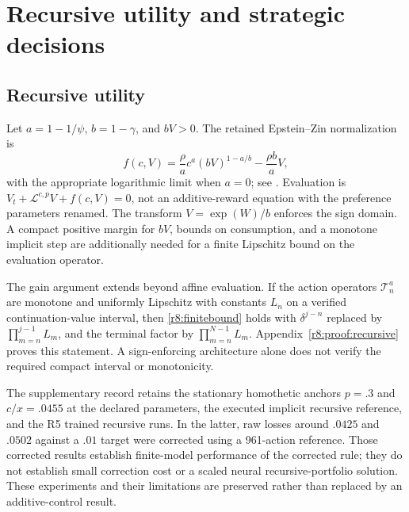 

\section{Recursive utility and strategic decisions}\label{r8:extensions}
\subsection{Recursive utility}
Let $a=1-1/\psi$, $b=1-\gamma$, and $bV>0$. The retained Epstein--Zin normalization is
\begin{equation}
 f(c,V)=\frac{\rho}{a}c^a(bV)^{1-a/b}-\frac{\rho b}{a}V,\label{r8:ez}
\end{equation}
with the appropriate logarithmic limit when $a=0$; see \citet{epstein1989,duffie1992}. Evaluation is $V_t+\mathcal L^{c,p}V+f(c,V)=0$, not an additive-reward equation with the preference parameters renamed. The transform $V=\exp(W)/b$ enforces the sign domain. A compact positive margin for $bV$, bounds on consumption, and a monotone implicit step are additionally needed for a finite Lipschitz bound on the evaluation operator.

The gain argument extends beyond affine evaluation. If the action operators $\mathcal T_n^a$ are monotone and uniformly Lipschitz with constants $L_n$ on a verified continuation-value interval, then \eqref{r8:finitebound} holds with $\delta^{j-n}$ replaced by $\prod_{m=n}^{j-1}L_m$, and the terminal factor by $\prod_{m=n}^{N-1}L_m$. Appendix~\ref{r8:proof:recursive} proves this statement. A sign-enforcing architecture alone does not verify the required compact interval or monotonicity.

The supplementary record retains the stationary homothetic anchors $p=.3$ and $c/x=.0455$ at the declared parameters, the executed implicit recursive reference, and the R5 trained recursive runs. In the latter, raw losses around $.0425$ and $.0502$ against a $.01$ target were corrected using a 961-action reference. Those corrected results establish finite-model performance of the corrected rule; they do not establish small correction cost or a scaled neural recursive-portfolio solution. These experiments and their limitations are preserved rather than replaced by an additive-control result.

